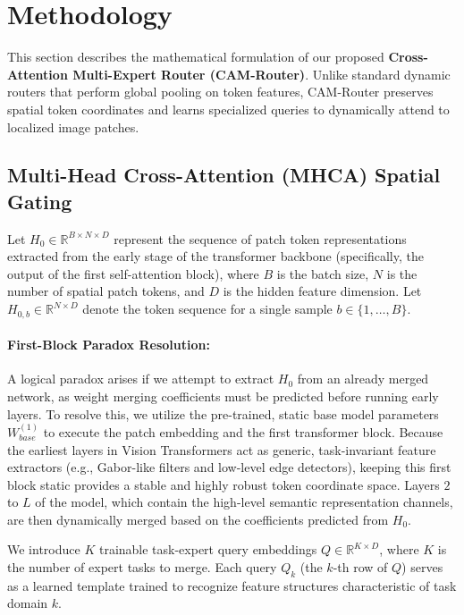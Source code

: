 \section{Methodology}
\label{sec:methodology}

This section describes the mathematical formulation of our proposed \textbf{Cross-Attention Multi-Expert Router (CAM-Router)}. Unlike standard dynamic routers that perform global pooling on token features, CAM-Router preserves spatial token coordinates and learns specialized queries to dynamically attend to localized image patches.

\subsection{Multi-Head Cross-Attention (MHCA) Spatial Gating}
Let $H_0 \in \mathbb{R}^{B \times N \times D}$ represent the sequence of patch token representations extracted from the early stage of the transformer backbone (specifically, the output of the first self-attention block), where $B$ is the batch size, $N$ is the number of spatial patch tokens, and $D$ is the hidden feature dimension. Let $H_{0, b} \in \mathbb{R}^{N \times D}$ denote the token sequence for a single sample $b \in \{1, \dots, B\}$.

\paragraph{First-Block Paradox Resolution:} A logical paradox arises if we attempt to extract $H_0$ from an already merged network, as weight merging coefficients must be predicted before running early layers. To resolve this, we utilize the pre-trained, static base model parameters $W_{base}^{(1)}$ to execute the patch embedding and the first transformer block. Because the earliest layers in Vision Transformers act as generic, task-invariant feature extractors (e.g., Gabor-like filters and low-level edge detectors), keeping this first block static provides a stable and highly robust token coordinate space. Layers $2$ to $L$ of the model, which contain the high-level semantic representation channels, are then dynamically merged based on the coefficients predicted from $H_0$.

We introduce $K$ trainable task-expert query embeddings $Q \in \mathbb{R}^{K \times D}$, where $K$ is the number of expert tasks to merge. Each query $Q_k$ (the $k$-th row of $Q$) serves as a learned template trained to recognize feature structures characteristic of task domain $k$.

